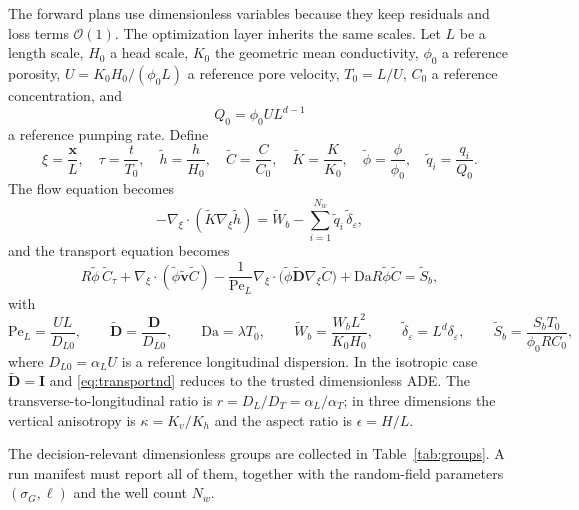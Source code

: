 \documentclass[11pt]{article}
\numberwithin{equation}{section}
\newcommand{\xx}{\mathbf{x}}
\newcommand{\vv}{\mathbf{v}}
\newcommand{\DD}{\mathbf{D}}
\newcommand{\Pe}{\mathrm{Pe}}
\newcommand{\Da}{\mathrm{Da}}
\theoremstyle{plain}
\begin{document}
The forward plans use dimensionless variables because they keep residuals and
loss terms $\mathcal{O}(1)$.  The optimization layer inherits the same scales.
Let $L$ be a length scale, $H_0$ a head scale, $K_0$ the geometric mean
conductivity, $\phi_0$ a reference porosity, $U=K_0H_0/(\phi_0L)$ a reference
pore velocity, $T_0=L/U$, $C_0$ a reference concentration, and
\begin{equation}
\label{eq:Q0}
Q_0=\phi_0UL^{d-1}
\end{equation}
a reference pumping rate.  Define
\begin{equation}
\label{eq:nondimvars}
\xi=\frac{\xx}{L},\quad
\tau=\frac{t}{T_0},\quad
\tilde h=\frac{h}{H_0},\quad
\tilde C=\frac{C}{C_0},\quad
\tilde K=\frac{K}{K_0},\quad
\tilde\phi=\frac{\phi}{\phi_0},\quad
\tilde q_i=\frac{q_i}{Q_0}.
\end{equation}
The flow equation becomes
\begin{equation}
\label{eq:flownd}
-\nabla_{\xi}\cdot(\tilde K\nabla_{\xi}\tilde h)
=\tilde W_b-\sum_{i=1}^{N_w}\tilde q_i\,\tilde\delta_{\varepsilon},
\end{equation}
and the transport equation becomes
\begin{equation}
\label{eq:transportnd}
R\tilde\phi\,\tilde C_{\tau}
+\nabla_{\xi}\cdot(\tilde\phi\tilde{\vv}\tilde C)
-\frac{1}{\Pe_L}\nabla_{\xi}\cdot
 \bigl(\tilde\phi\tilde{\DD}\nabla_{\xi}\tilde C\bigr)
+\Da R\tilde\phi\tilde C
=\tilde S_b,
\end{equation}
with
\begin{equation}
\label{eq:groups}
\Pe_L=\frac{UL}{D_{L0}},\qquad
\tilde{\DD}=\frac{\DD}{D_{L0}},\qquad
\Da=\lambda T_0,\qquad
\tilde W_b=\frac{W_bL^2}{K_0H_0},\qquad
\tilde\delta_{\varepsilon}=L^d\delta_{\varepsilon},\qquad
\tilde S_b=\frac{S_bT_0}{\phi_0RC_0},
\end{equation}
where $D_{L0}=\alpha_LU$ is a reference longitudinal dispersion.  In the
isotropic case $\tilde{\DD}=\mathbf{I}$ and \eqref{eq:transportnd} reduces to
the trusted dimensionless ADE.  The transverse-to-longitudinal ratio is
$r=D_L/D_T=\alpha_L/\alpha_T$; in three dimensions the vertical anisotropy is
$\kappa=K_v/K_h$ and the aspect ratio is $\epsilon=H/L$.

The decision-relevant dimensionless groups are collected in
Table~\ref{tab:groups}.  A run manifest must report all of them, together with
the random-field parameters $(\sigma_G,\ell)$ and the well count $N_w$.
\end{document}
